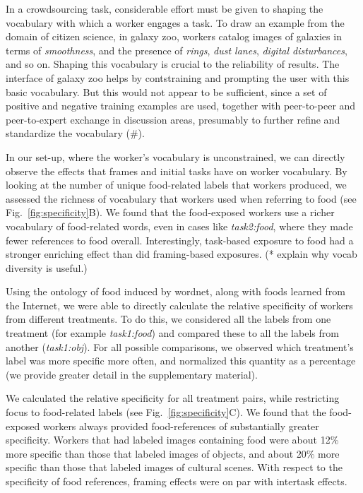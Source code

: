 \documentclass[12pt]{article}
\begin{document}
In a crowdsourcing task, considerable effort must be given to shaping the 
vocabulary with which a worker engages a task.  To draw an example from the 
domain of citizen science, in galaxy zoo, workers catalog images of galaxies 
in terms of \textit{smoothness}, and the presence of \textit{rings}, 
\textit{dust lanes}, \textit{digital disturbances}, and so on.  Shaping this 
vocabulary is crucial to the reliability of results.  The interface of
galaxy zoo helps by contstraining and prompting the user with this basic 
vocabulary.  But this would not appear to be sufficient, since
a set of positive and negative training examples are used, together with
peer-to-peer and peer-to-expert exchange in discussion areas, presumably to
further refine and standardize the vocabulary (\#).  

In our set-up, where the worker's vocabulary is unconstrained, we can 
directly observe the effects that frames and initial tasks have on worker 
vocabulary.  By looking at the number of unique food-related labels that 
workers produced, we assessed the richness of vocabulary that workers used when
referring to food (see Fig.~\ref{fig:specificity}B).  We found that the 
food-exposed workers use a richer vocabulary of 
food-related words, even in cases like \textit{task2:food}, where they 
made fewer references to food overall.  
Interestingly, task-based exposure to food had a stronger enriching effect 
 than did framing-based exposures. (* explain why vocab 
diversity is useful.) 

Using the ontology of food induced by wordnet, along with foods learned from
the Internet, we were able to directly calculate the relative specificity of 
workers from different treatments.
To do this, we considered all the labels from one treatment
(for example \textit{task1:food}) and compared these to all the labels from 
another (\textit{task1:obj}).  For all possible comparisons, we observed 
which treatment's label was more specific more often, and normalized this
quantity as a percentage (we provide greater detail in the supplementary 
material).

We calculated the relative specificity for all treatment pairs, while 
restricting focus to 
food-related labels (see Fig.~\ref{fig:specificity}C).  We found that 
the food-exposed workers always provided food-references of substantially 
greater specificity.  Workers that had labeled images containing food 
were about 12\% more specific than those that labeled images of objects,
and about 20\% more specific than those that labeled images of cultural 
scenes.  With respect to the specificity of food references, framing effects 
were on par with intertask effects.
\end{document}
